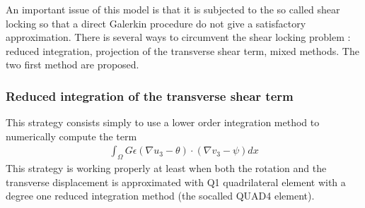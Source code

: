 \documentclass[a4paper,11pt,english]{sphinxmanual}
\begin{document}
An important issue of this model is that it is subjected to the so called shear locking so that a direct Galerkin procedure do not give a satisfactory approximation. There is several ways to circumvent the shear locking problem : reduced integration, projection of the transverse shear term, mixed methods. The two first method are proposed.


\subsubsection{Reduced integration of the transverse shear term}
\label{\detokenize{userdoc/model_Mindlin_plate:reduced-integration-of-the-transverse-shear-term}}
This strategy consists simply to use a lower order integration method to numerically compute the term
\begin{equation*}
\begin{split}\int_{\Omega}G\epsilon (\nabla u_3 - \theta)\cdot(\nabla v_3 - \psi)dx\end{split}
\end{equation*}
This strategy is working properly at least when both the rotation and the transverse displacement is approximated with Q1 quadrilateral element with a degree one reduced integration method (the so\sphinxhyphen{}called QUAD4 element).
\end{document}
